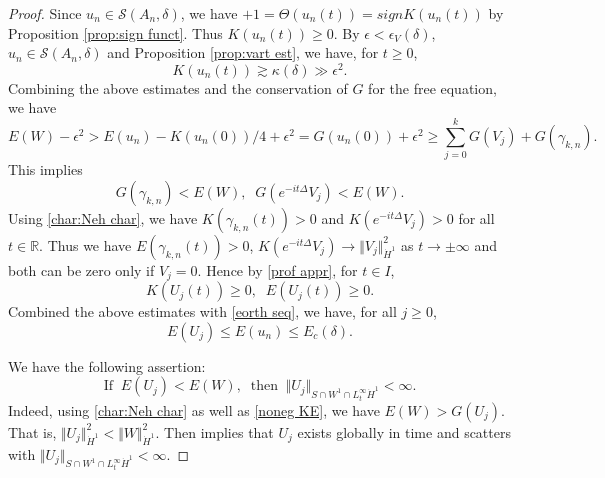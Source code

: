 \documentclass[reqno, 11pt]{amsart}
\numberwithin{equation}{section}
\newcommand{\R}{\mathbb{R}}
\theoremstyle{plain}
\theoremstyle{definition}
\numberwithin{equation}{section}
\numberwithin{theorem}{section}
\numberwithin{equation}{section}
\numberwithin{equation}{section}
\numberwithin{theorem}{section}
\begin{document}
\begin{proof}
		Since $u_n \in \mathscr{S}(A_n,\delta)$, we have $+1=\Theta(u_n(t))=signK(u_n(t))$ by Proposition \ref{prop:sign funct}. Thus $K(u_n(t))\geq0$. By $\epsilon<\epsilon_{V}(\delta)$, $u_n \in \mathscr{S}(A_n,\delta)$ and Proposition \ref{prop:vart est}, we have, for $t\geq0$,
		\begin{equation*}
		K(u_n(t))\gtrsim\kappa(\delta)\gg\epsilon^2.
		\end{equation*}
		Combining the above estimates and the conservation of $G$ for the free equation, we have
		\begin{equation*}
		E(W)-\epsilon^2>E(u_n)-K(u_n(0))/4+\epsilon^2=G(u_n(0))+\epsilon^2\geq \sum_{j=0}^{k}G(V_j)+G(\gamma_{k,n}).
		\end{equation*}
		This implies
		\begin{equation*}
		G(\gamma_{k,n})<E(W),\;\;G(e^{-it\Delta}V_j)<E(W).
		\end{equation*}
		Using \eqref{char:Neh char}, we have $K(\gamma_{k,n}(t))>0$ and $K(e^{-it\Delta}V_j)>0$ for all $t\in\R$. Thus we have $E(\gamma_{k,n}(t))>0$, $K(e^{-it\Delta}V_j)\rightarrow \Vert V_j\Vert_{\dot H^1}^2$ as $t\rightarrow \pm\infty$ and both can be zero only if $V_j=0$. Hence by \eqref{prof appr}, for $t\in I$,
		\begin{equation}\label{noneg KE}
		K(U_j(t))\geq0 ,\;\; E(U_j(t))\geq0.
		\end{equation}
		Combined the above estimates with \eqref{eorth seq}, we have, for all $j\geq0$,
		\begin{equation*}
		E(U_j)\leq E(u_n)\leq E_c(\delta).
		\end{equation*}
		
		We have the following assertion:
		\begin{equation*}
		\text{If}\;\; E(U_j)<E(W),\;\;\text{then}\;\;\Vert U_j\Vert_{S\cap W^1\cap L_{t}^{\infty}\dot H^1}<\infty.
		\end{equation*}
		Indeed, using \eqref{char:Neh char} as well as \eqref{noneg KE}, we have $E(W)>G(U_j)$. That is, $\Vert U_j\Vert_{\dot H^1}^2<\Vert W\Vert_{\dot H^1}^2$. Then \cite[Theorem 1.1]{MXZ:crit Hart:f rad} implies that $U_j$ exists globally in time and scatters with $\Vert U_j\Vert_{S\cap W^1\cap L_{t}^{\infty}\dot H^1}<\infty$.
		

\end{proof}
\end{document}
